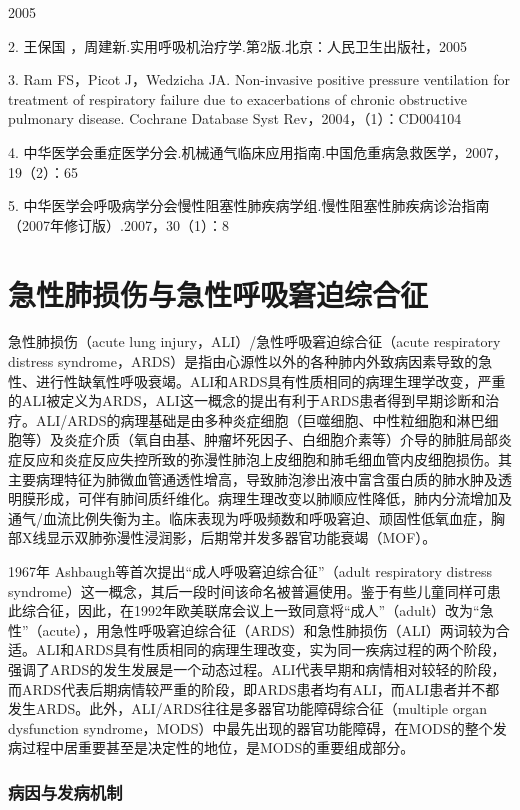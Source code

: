 2005

2. 王保国 ，周建新.实用呼吸机治疗学.第2版.北京：人民卫生出版社，2005

3. Ram FS，Picot J，Wedzicha JA. Non-invasive positive pressure
ventilation for treatment of respiratory failure due to exacerbations of
chronic obstructive pulmonary disease. Cochrane Database Syst
Rev，2004，（1）：CD004104

4.
中华医学会重症医学分会.机械通气临床应用指南.中国危重病急救医学，2007，19（2）：65

5.
中华医学会呼吸病学分会慢性阻塞性肺疾病学组.慢性阻塞性肺疾病诊治指南（2007年修订版）.2007，30（1）：8

\protect\hypertarget{text00078.html}{}{}

\chapter{急性肺损伤与急性呼吸窘迫综合征}

急性肺损伤（acute lung injury，ALI）/急性呼吸窘迫综合征（acute
respiratory distress
syndrome，ARDS）是指由心源性以外的各种肺内外致病因素导致的急性、进行性缺氧性呼吸衰竭。ALI和ARDS具有性质相同的病理生理学改变，严重的ALI被定义为ARDS，ALI这一概念的提出有利于ARDS患者得到早期诊断和治疗。ALI/ARDS的病理基础是由多种炎症细胞（巨噬细胞、中性粒细胞和淋巴细胞等）及炎症介质（氧自由基、肿瘤坏死因子、白细胞介素等）介导的肺脏局部炎症反应和炎症反应失控所致的弥漫性肺泡上皮细胞和肺毛细血管内皮细胞损伤。其主要病理特征为肺微血管通透性增高，导致肺泡渗出液中富含蛋白质的肺水肿及透明膜形成，可伴有肺间质纤维化。病理生理改变以肺顺应性降低，肺内分流增加及通气/血流比例失衡为主。临床表现为呼吸频数和呼吸窘迫、顽固性低氧血症，胸部X线显示双肺弥漫性浸润影，后期常并发多器官功能衰竭（MOF）。

1967年 Ashbaugh等首次提出“成人呼吸窘迫综合征”（adult respiratory
distress
syndrome）这一概念，其后一段时间该命名被普遍使用。鉴于有些儿童同样可患此综合征，因此，在1992年欧美联席会议上一致同意将“成人”（adult）改为“急性”（acute），用急性呼吸窘迫综合征（ARDS）和急性肺损伤（ALI）两词较为合适。ALI和ARDS具有性质相同的病理生理改变，实为同一疾病过程的两个阶段，强调了ARDS的发生发展是一个动态过程。ALI代表早期和病情相对较轻的阶段，而ARDS代表后期病情较严重的阶段，即ARDS患者均有ALI，而ALI患者并不都发生ARDS。此外，ALI/ARDS往往是多器官功能障碍综合征（multiple
organ dysfunction
syndrome，MODS）中最先出现的器官功能障碍，在MODS的整个发病过程中居重要甚至是决定性的地位，是MODS的重要组成部分。

\subsection{病因与发病机制}

